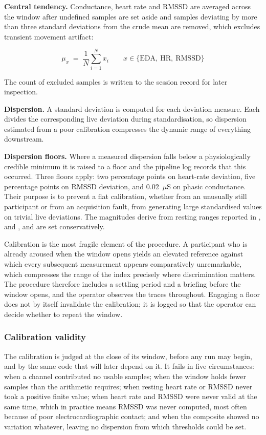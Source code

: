 \textbf{Central tendency.} Conductance, heart rate and RMSSD are
averaged across the window after undefined samples are set aside
and samples deviating by more than three standard deviations from
the crude mean are removed, which excludes transient movement
artifact:

\begin{equation}
\mu_{x} \;=\; \frac{1}{N} \sum_{i=1}^{N} x_{i}
\qquad x \in \{\mathrm{EDA},\ \mathrm{HR},\ \mathrm{RMSSD}\}
\end{equation}

The count of excluded samples is written to the session record
for later inspection.

\textbf{Dispersion.} A standard deviation is computed for each
deviation measure. Each divides the corresponding live deviation
during standardisation, so dispersion estimated from a poor
calibration compresses the dynamic range of everything downstream.

\textbf{Dispersion floors.} Where a measured dispersion falls
below a physiologically credible minimum it is raised to a floor
and the pipeline log records that this occurred. Three floors apply:
two percentage points on heart-rate deviation, five percentage
points on RMSSD deviation, and 0.02~$\mu$S on phasic conductance.
Their purpose is to prevent a flat calibration, whether from an
unusually still participant or from an acquisition fault, from
generating large standardised values on trivial live deviations.
The magnitudes derive from resting ranges reported in
\citet{taskforce1996}, \citet{shaffer2017} and
\citet{boucsein2012}, and are set conservatively.

Calibration is the most fragile element of the procedure. A
participant who is already aroused when the window opens yields
an elevated reference against which every subsequent measurement
appears comparatively unremarkable, which compresses the range of
the index precisely where discrimination matters. The procedure
therefore includes a settling period and a briefing before the
window opens, and the operator observes the traces throughout.
Engaging a floor does not by itself invalidate the calibration;
it is logged so that the operator can decide whether to repeat the
window.

\subsubsection{Calibration validity}
\label{sec:validity}

The calibration is judged at the close of its window, before any
run may begin, and by the same code that will later depend on it.
It fails in five circumstances: when a channel contributed no
usable samples; when the window holds fewer samples than the
arithmetic requires; when resting heart rate or RMSSD never took a
positive finite value; when heart rate and RMSSD were never valid
at the same time, which in practice means RMSSD was never
computed, most often because of poor electrocardiographic contact;
and when the composite showed no variation whatever, leaving no
dispersion from which thresholds could be set.

